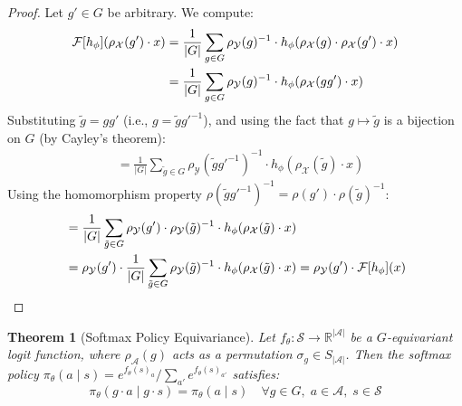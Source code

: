 \documentclass{article}
\newtheorem{theorem}{Theorem}[section]
\begin{document}
\begin{proof}
Let $g' \in G$ be arbitrary. We compute:
\begin{align}
    \mathcal{F}[h_\phi]\!\left(\rho_\mathcal{X}(g') \cdot x\right)
    &= \frac{1}{|G|} \sum_{g \in G} \rho_\mathcal{Y}(g)^{-1} \cdot h_\phi\!\left(\rho_\mathcal{X}(g) \cdot \rho_\mathcal{X}(g') \cdot x\right) \notag \\
    &= \frac{1}{|G|} \sum_{g \in G} \rho_\mathcal{Y}(g)^{-1} \cdot h_\phi\!\left(\rho_\mathcal{X}(gg') \cdot x\right)
\end{align}
Substituting $\tilde{g} = gg'$ (i.e., $g = \tilde{g}g'^{-1}$), and using the fact that $g \mapsto \tilde{g}$ is a bijection on $G$ (by Cayley's theorem):
\begin{align}
    &= \frac{1}{|G|} \sum_{\tilde{g} \in G} \rho_\mathcal{Y}(\tilde{g}g'^{-1})^{-1} \cdot h_\phi\!\left(\rho_\mathcal{X}(\tilde{g}) \cdot x\right)
\end{align}
Using the homomorphism property $\rho(\tilde{g}g'^{-1})^{-1} = \rho(g') \cdot \rho(\tilde{g})^{-1}$:
\begin{align}
    &= \frac{1}{|G|} \sum_{\tilde{g} \in G} \rho_\mathcal{Y}(g') \cdot \rho_\mathcal{Y}(\tilde{g})^{-1} \cdot h_\phi\!\left(\rho_\mathcal{X}(\tilde{g}) \cdot x\right) \notag \\
    &= \rho_\mathcal{Y}(g') \cdot \frac{1}{|G|} \sum_{\tilde{g} \in G} \rho_\mathcal{Y}(\tilde{g})^{-1} \cdot h_\phi\!\left(\rho_\mathcal{X}(\tilde{g}) \cdot x\right)
    = \rho_\mathcal{Y}(g') \cdot \mathcal{F}[h_\phi](x)
\end{align}
\end{proof}

\begin{theorem}[Softmax Policy Equivariance]\label{thm:softmax_equiv}
Let $f_\theta: \mathcal{S} \to \mathbb{R}^{|\mathcal{A}|}$ be a $G$-equivariant logit function, where $\rho_\mathcal{A}(g)$ acts as a permutation $\sigma_g \in S_{|\mathcal{A}|}$. Then the softmax policy $\pi_\theta(a \mid s) = e^{f_\theta(s)_a} / \sum_{a'} e^{f_\theta(s)_{a'}}$ satisfies:
\begin{equation}
    \pi_\theta(g \cdot a \mid g \cdot s) = \pi_\theta(a \mid s) \quad \forall g \in G,\; a \in \mathcal{A},\; s \in \mathcal{S}
\end{equation}
\end{theorem}
\end{document}
